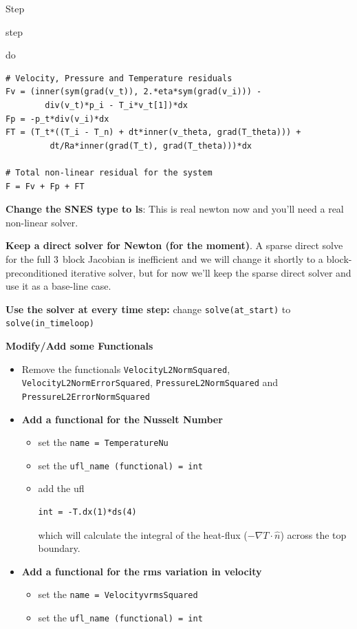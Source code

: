 \begin{steps}{Step}
\begin{steps}{step}
\begin{steps}{do}
\begin{lstlisting}[style=UFL]
# Velocity, Pressure and Temperature residuals
Fv = (inner(sym(grad(v_t)), 2.*eta*sym(grad(v_i))) - 
        div(v_t)*p_i - T_i*v_t[1])*dx
Fp = -p_t*div(v_i)*dx
FT = (T_t*((T_i - T_n) + dt*inner(v_theta, grad(T_theta))) + 
         dt/Ra*inner(grad(T_t), grad(T_theta)))*dx

# Total non-linear residual for the system
F = Fv + Fp + FT
    \end{lstlisting}
  \item \textbf{Change the SNES type to ls}:  This is real newton now
    and you'll need a real non-linear solver.
  \item \textbf{Keep a direct solver for Newton (for the moment)}.  A
    sparse direct solve for the full $3\time3$ block Jacobian is
    inefficient and we will change it shortly to a
    block-preconditioned iterative solver, but for now we'll keep the
    sparse direct solver and use it as a base-line case.
    \end{steps}
  \item \textbf{Use the solver at every time step:} change
    \texttt{solve(at\_start)} to \texttt{solve(in\_timeloop)}
  \item \textbf{Modify/Add some Functionals}
    \begin{itemize}
    \item Remove the functionals \texttt{VelocityL2NormSquared},
      \texttt{VelocityL2NormErrorSquared},
      \texttt{PressureL2NormSquared} and
      \texttt{PressureL2ErrorNormSquared}
    \item \textbf{Add a functional for the Nusselt Number}
      \begin{itemize}
      \item set the \texttt{name = TemperatureNu}
      \item set the \texttt{ufl\_name (functional) = int}
      \item add the ufl
       \begin{lstlisting}[style=UFL]
         int = -T.dx(1)*ds(4)
       \end{lstlisting}
 which will calculate the integral of the heat-flux ($-\nabla T\cdot
 \hat{n}$) across the top boundary.
\end{itemize}
\item \textbf{Add a functional for the rms variation in velocity}
      \begin{itemize}
      \item set the \texttt{name = VelocityvrmsSquared}
      \item set the \texttt{ufl\_name (functional) = int}

\end{itemize}
\end{itemize}
\end{steps}
\end{steps}
